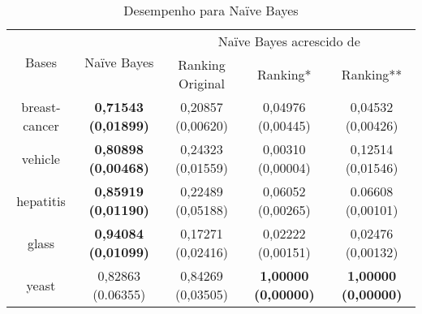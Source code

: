 \begin{table}[h]
    \begin{tabular}{ c c c c c }
        \hline

        \multirow{2}{*}{Bases} & \multirow{2}{*}{Naïve Bayes} & \multicolumn{3}{c}{Naïve Bayes acrescido de} \\ \cline{3-5}
        & & {\small Ranking Original} & {\small Ranking*} & {\small  Ranking**} \\
    
        \hline
        
        breast-cancer & {\small \textbf{0,71543 (0,01899)}} & {\small 0,20857 (0,00620)} & {\small 0,04976 (0,00445)} & {\small 0,04532 (0,00426)} \\
        vehicle & {\small \textbf{0,80898 (0,00468)}} & {\small 0,24323 (0,01559)} & {\small 0,00310 (0,00004)} & {\small 0,12514 (0,01546)} \\
        hepatitis & {\small \textbf{0,85919 (0,01190)}} & {\small 0,22489 (0,05188)} & {\small 0,06052 (0,00265)} & {\small 0.06608 (0,00101)} \\
        glass & {\small \textbf{0,94084 (0,01099)}} & {\small 0,17271 (0,02416)} & {\small 0,02222 (0,00151)} & {\small 0,02476 (0,00132)} \\
        yeast & {\small 0,82863 (0.06355)} & {\small 0,84269 (0,03505)} & {\small \textbf{1,00000 (0,00000)}} & {\small \textbf{1,00000 (0,00000)}} \\
    
        \hline
    \end{tabular}
    
    \caption{Desempenho para Naïve Bayes}
    \label{nb_results_table}
\end{table}

